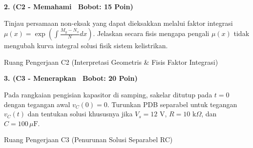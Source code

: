 \documentclass[10pt,a4paper]{article}
\begin{document}
\vspace{1mm}

\noindent\textbf{2. (C2 - Memahami \textbar\ Bobot: 15 Poin)}\par\vspace{0.5mm}
{\footnotesize Tinjau persamaan non-eksak yang dapat dieksakkan melalui faktor integrasi $\mu(x) = \exp\left(\int \frac{M_y - N_x}{N} dx\right)$. Jelaskan secara fisis mengapa pengali $\mu(x)$ tidak mengubah kurva integral solusi fisik sistem kelistrikan.}
\begin{answerbox}{Ruang Pengerjaan C2 (Interpretasi Geometris \& Fisis Faktor Integrasi)}
  \vspace{2.1cm}
\end{answerbox}

\vspace{1mm}

\noindent\textbf{3. (C3 - Menerapkan \textbar\ Bobot: 20 Poin)}\par\vspace{0.5mm}
\noindent\begin{minipage}[t]{0.60\textwidth}%
  {\footnotesize Pada rangkaian pengisian kapasitor di samping, sakelar ditutup pada $t=0$ dengan tegangan awal $v_C(0) = 0$. Turunkan PDB separabel untuk tegangan $v_C(t)$ dan tentukan solusi khususnya jika $V_s = 12\text{ V}$, $R = 10\text{ k}\Omega$, dan $C = 100\,\mu\text{F}$.}%
\end{minipage}%
\hfill%
\begin{minipage}[t]{0.37\textwidth}%
  \centering
\end{minipage}\par\vspace{1mm}
\begin{answerbox}{Ruang Pengerjaan C3 (Penurunan Solusi Separabel RC)}
  \vspace{2.8cm}
\end{answerbox}

\newpage
\end{document}
